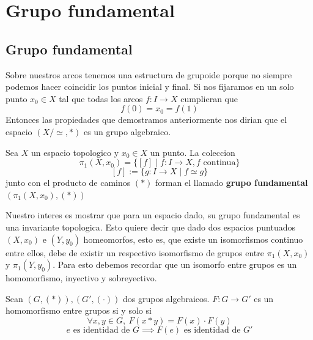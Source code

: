 \section{Grupo fundamental}




\subsection{Grupo fundamental}
Sobre nuestros arcos tenemos una estructura de grupoide porque no siempre
podemos hacer coincidir los puntos inicial y final. Si nos fijaramos en
un solo punto \(x_0 \in X\) tal que todas los arcos \(f : I \to X\)
cumplieran que
\[ f(0) = x_0 = f (1) \]
Entonces las propiedades que demostramos anteriormente nos dirian que el
espacio \((X / \simeq, *)\) es un grupo algebraico.
\begin{definicion}
  Sea \(X\) un espacio topologico y \(x_0 \in X\) un punto. La coleccion
  \[ \pi_1 (X,x_0) = \{ [f] \mid f : I \to X, f \text{ continua}\}\]
  \[ [f] := \{ g : I \to X \mid f \simeq g\}\]
  junto con el producto de caminos \((*)\) forman el llamado
  \textbf{grupo fundamental} \((\pi_1(X,x_0), (*))\)
\end{definicion}
\noindent Nuestro interes es mostrar que para un espacio dado, su grupo
fundamental es una invariante topologica. Esto quiere decir que dado dos
espacios puntuados \((X,x_0)\) e \((Y,y_0)\) homeomorfos, esto es, que
existe un isomorfismos continuo entre ellos, debe de existir un
respectivo isomorfismo de grupos entre \(\pi_1(X,x_0)\) y
\(\pi_1(Y,y_0)\). Para esto debemos recordar que un isomorfo entre
grupos es un homomorfismo, inyectivo y sobreyectivo.
\begin{definicion}
  Sean \((G,(*)), (G', (\cdot))\) dos grupos algebraicos. \(F : G \to
  G'\) es un homomorfismo entre grupos si y solo si
  \[ \forall x,y \in G,\ F (x * y) = F(x) \cdot F(y)\]
  \[ e \text{ es identidad de } G \implies F(e) \text { es identidad de } G' \]
\end{definicion}

